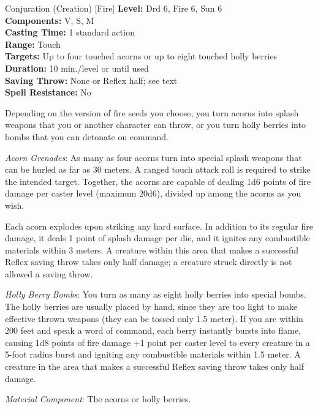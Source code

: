 {Conjuration (Creation) [Fire]}
{
	\textbf{Level:}
	Drd 6, Fire 6, Sun 6\\
	\textbf{Components:}
	V, S, M\\
	\textbf{Casting Time:}
	1 standard action\\
	\textbf{Range:}
	Touch\\
	\textbf{Targets:}
	Up to four touched acorns or up to eight touched holly berries\\
	\textbf{Duration:}
	10 min./level or until used\\
	\textbf{Saving Throw:}
	None or Reflex half; see text\\
	\textbf{Spell Resistance:}
	No\\
}
{
	Depending on the version of fire seeds you choose, you turn acorns into splash weapons that you or another character can throw, or you turn holly berries into bombs that you can detonate on command.

	\textit{Acorn Grenades}:
	As many as four acorns turn into special splash weapons that can be hurled as far as 30 meters. A ranged touch attack roll is required to strike the intended target. Together, the acorns are capable of dealing 1d6 points of fire damage per caster level (maximum 20d6), divided up among the acorns as you wish.

	Each acorn explodes upon striking any hard surface. In addition to its regular fire damage, it deals 1 point of splash damage per die, and it ignites any combustible materials within 3 meters. A creature within this area that makes a successful Reflex saving throw takes only half damage; a creature struck directly is not allowed a saving throw.

	\textit{Holly Berry Bombs}:
	You turn as many as eight holly berries into special bombs. The holly berries are usually placed by hand, since they are too light to make effective thrown weapons (they can be tossed only 1.5 meter). If you are within 200 feet and speak a word of command, each berry instantly bursts into flame, causing 1d8 points of fire damage +1 point per caster level to every creature in a 5-foot radius burst and igniting any combustible materials within 1.5 meter. A creature in the area that makes a successful Reflex saving throw takes only half damage.

	\textit{Material Component}:
	The acorns or holly berries.

}
